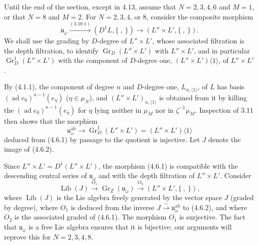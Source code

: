 \documentclass[10pt,a4paper]{article}
\newcommand{\Gr}{\operatorname{Gr}}
\newcommand{\ad}{\operatorname{ad}}
\newcommand{\uomega}{\mathfrak u_\omega}
\theoremstyle{deligne}
\newcommand{\heading}[1]{\vspace{0.65em}\noindent{\bfseries #1}\quad}
\begin{document}
\heading{4.6.} Until the end of the section, except in 4.13, assume that \(N=2,3,4,6\) and \(M=1\), or that \(N=8\) and \(M=2\). For \(N=2,3,4\), or \(8\), consider the composite morphism
\[
\tag{4.6.1}
\uomega\overset{(3.10.1)}{\longrightarrow}(D^1L,\{\ ,\ \})\longrightarrow(L''\times L',\{\ ,\ \}).
\]
We shall use the grading by \(D\)-degree of \(L''\times L'\), whose associated filtration is the depth filtration, to identify \(\Gr_D(L''\times L')\) with \(L''\times L'\), and in particular \(\Gr_D^1(L''\times L')\) with the component of \(D\)-degree one, \((L''\times L')\langle1\rangle\), of \(L''\times L'\).

By (4.1.1), the component of degree \(n\) and \(D\)-degree one, \(L_{n,\langle1\rangle}\), of \(L\) has basis \((\ad e_0)^{n-1}(e_\eta)\) (\(\eta\in\mu_N\)), and \((L''\times L')_{n,\langle1\rangle}\) is obtained from it by killing the \((\ad e_0)^{n-1}(e_\eta)\) for \(\eta\) lying neither in \(\mu_M\) nor in \(\zeta^{-1}\mu_M\). Inspection of 3.11 then shows that the morphism
\[
\tag{4.6.2}
\uomega^{\mathrm{ab}}\longrightarrow \Gr_D^1(L''\times L')=(L''\times L')\langle1\rangle
\]
deduced from (4.6.1) by passage to the quotient is injective. Let \(J\) denote the image of (4.6.2).

Since \(L''\times L'=D^1(L''\times L')\), the morphism (4.6.1) is compatible with the descending central series of \(\uomega\) and with the depth filtration of \(L''\times L'\). Consider
\[
\tag{4.6.3}
\operatorname{Lib}(J)\overset{O_1}{\longrightarrow}\Gr_Z(\uomega)
\overset{O_2}{\longrightarrow}(L''\times L',\{\ ,\ \}),
\]
where \(\operatorname{Lib}(J)\) is the Lie algebra freely generated by the vector space \(J\) (graded by degree), where \(O_1\) is deduced from the inverse \(J\overset{\sim}{\to}\uomega^{\mathrm{ab}}\) to (4.6.2), and where \(O_2\) is the associated graded of (4.6.1). The morphism \(O_1\) is surjective. The fact that \(\uomega\) is a free Lie algebra ensures that it is bijective; our arguments will reprove this for \(N=2,3,4,8\).
\end{document}
